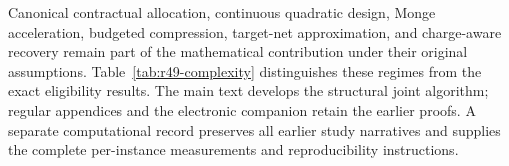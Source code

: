Canonical contractual allocation, continuous quadratic design, Monge acceleration, budgeted compression, target-net approximation, and charge-aware recovery remain part of the mathematical contribution under their original assumptions. Table~\ref{tab:r49-complexity} distinguishes these regimes from the exact eligibility results. The main text develops the structural joint algorithm; regular appendices and the electronic companion retain the earlier proofs. A separate computational record preserves all earlier study narratives and supplies the complete per-instance measurements and reproducibility instructions.
